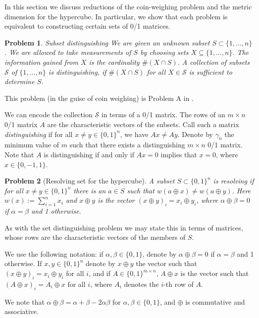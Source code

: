 \documentclass{article}
\newcommand{\cS}{\mathcal{S}}
\newtheorem{problem}{Problem}
\begin{document}
In this section we discuss reductions of the coin-weighing problem and
the metric dimension for the hypercube.  In particular, we show that
each problem is equivalent to constructing certain sets of 0/1
matrices.

\begin{problem}{Subset distinguishing}
We are given an unknown subset $S \subset \{1, \dots, n\}$.  We are
allowed to take \emph{measurements} of $S$ by choosing sets $X
\subseteq \{1, \dots, n\}$.  The information gained from $X$ is the
cardinality $\# (X \cap S)$.  A collection of subsets $\cS$ of $\{1, \dots,
n\}$ is \emph{distinguishing}, if $\# (X \cap S)$ for all $X \in \cS$
is sufficient to determine $S$.
\end{problem}

This problem (in the guise of coin weighing) is Problem A in
\cite{erdos1963two}.

We can encode the collection $\cS$ in terms of a 0/1 matrix.  The rows
of an $m \times n$ 0/1 matrix $A$ are the characteristic vectors of
the subsets.  Call such a matrix \emph{distinguishing} if for all $x
\ne y \in \{0,1\}^n$, we have $Ax \ne Ay$.  Denote by $\gamma_n$ the
minimum value of $m$ such that there exists a distinguishing $m \times
n$ 0/1 matrix.  Note that $A$ is distinguishing if and only if $Ax =
0$ implies that $x = 0$, where $x \in \{0, -1, 1\}$.

\begin{problem}[Resolving set for the hypercube]
A subset $S \subset \{0,1\}^n$ is \emph{resolving} if for all $x \ne y
\in \{0,1\}^n$ there is an $a \in S$ such that $w(a \oplus x) \ne w(a
\oplus y)$.  Here $w(x) := \sum_{i=1}^n x_i$ and $x \oplus y$ is the
vector $(x \oplus y)_i = x_i \oplus y_i$, where $\alpha \oplus \beta =
0$ if $\alpha = \beta$ and 1 otherwise.
\end{problem}
As with the set distinguishing problem we may state this in terms of
matrices, whose rows are the characteristic vectors of the members of
$S$.

We use the following notation: if $\alpha, \beta \in \{0,1\}$, denote
by $\alpha \oplus \beta = 0$ if $\alpha = \beta$ and 1 otherwise.  If
$x, y \in \{0,1\}^n$ denote by $x \oplus y$ the vector such that $(x
\oplus y)_i = x_i \oplus y_i$ for all $i$, and if $A \in \{0,1\}^{m
  \times n}$, $A \oplus x$ is the vector such that $(A \oplus x)_i =
A_i \oplus x$ for all $i$, where $A_i$ denotes the $i$-th row of $A$. 

We note that $\alpha \oplus \beta = \alpha + \beta - 2 \alpha \beta$
for $\alpha, \beta \in \{0,1\}$, and $\oplus$ is commutative and associative.
\end{document}
